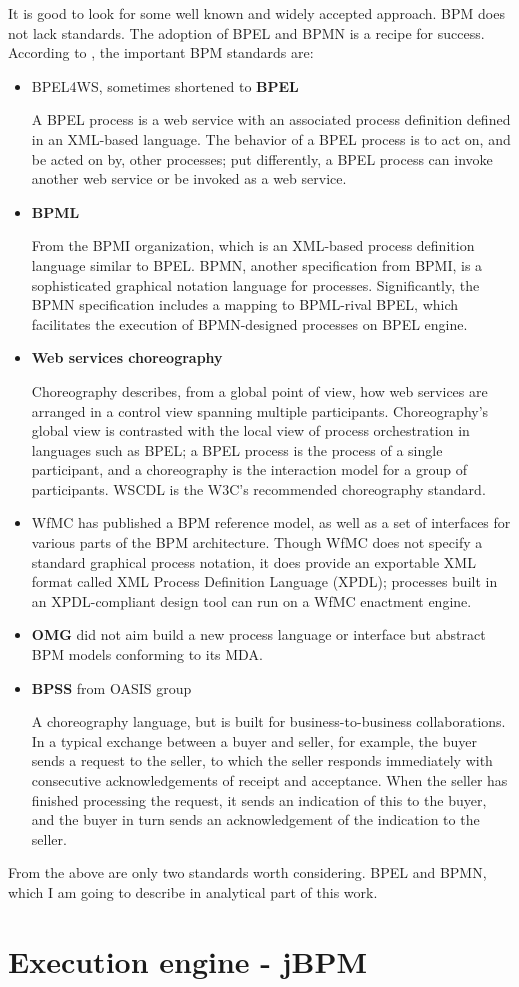 	It is good to look for some well known and widely accepted approach. BPM does not lack standards. The adoption of
	\gls{BPEL} and \gls{BPMN} is a recipe for success. According to \cite[Ch.~1.3.1]{bpm}, the important BPM standards are:
	
	\begin{itemize}
		\item \gls{BPEL4WS}, sometimes shortened to \textbf{\gls{BPEL}}
		
		A BPEL process is a web service with an associated process definition defined in an XML-based language. The behavior
		of a BPEL process is to act on, and be acted on by, other processes; put differently, a BPEL process can invoke
		another web service or be invoked as a web service.
	  	\item \textbf{\gls{BPML}}
	  
		From the \gls{BPMI} organization, which is an XML-based process definition language similar to BPEL. BPMN, another
	  	specification from BPMI, is a sophisticated graphical notation language for processes. Significantly, the BPMN
	  	specification includes a mapping to BPML-rival BPEL, which facilitates the execution of BPMN-designed processes on
	  	BPEL engine.
	  	\item \textbf{Web services choreography}
	
	  	Choreography describes, from a global point of view, how web services are arranged in a control view spanning
	  	multiple participants. Choreography's global view is contrasted with the local view of process orchestration in
	  	languages such as BPEL; a BPEL process is the process of a single participant, and a choreography is the interaction
	  	model for a group of participants. \gls{WSCDL} is the W3C's recommended choreography standard.
	
	  	\item \gls{WfMC} has published a BPM reference model, as well as a set of interfaces for various parts of the BPM
	  	architecture. Though WfMC does not specify a standard graphical process notation, it does provide an exportable XML
	  	format called XML Process Definition Language (XPDL); processes built in an XPDL-compliant design tool can run on a
	  	WfMC enactment engine.
	  	
	  	\item \textbf{\gls{OMG}} did not aim build a new process language or interface but abstract BPM models conforming to
	  	its \gls{MDA}.
	  	\item \textbf{\gls{BPSS}} from OASIS group

	  	A choreography language, but is built for business-to-business collaborations. In a typical exchange between a buyer
	  	and seller, for example, the buyer sends a request to the seller, to which the seller responds immediately with
	  	consecutive acknowledgements of receipt and acceptance. When the seller has finished processing the request, it
	  	sends an indication of this to the buyer, and the buyer in turn sends an acknowledgement of the indication to the
	  	seller.
	\end{itemize}
	
	From the above are only two standards worth considering. BPEL and BPMN, which I am going to describe in analytical part
	of this work.

	\section{Execution engine - jBPM}